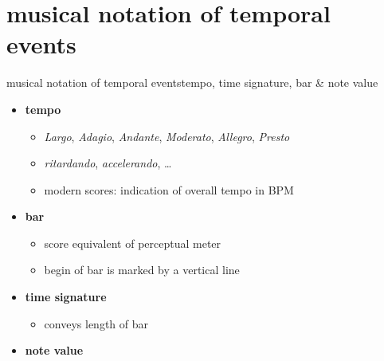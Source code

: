     \section[musical]{musical notation of temporal events}
        \begin{frame}{musical notation of temporal events}{tempo, time signature, bar \& note value}
            \begin{itemize}
                \item	\textbf{tempo}
                    \begin{itemize}
                        \item	\textsl{Largo}, \textsl{Adagio}, \textsl{Andante}, \textsl{Moderato}, \textsl{Allegro}, \textsl{Presto}
                        \pause
                        \item	\textsl{ritardando}, \textsl{accelerando}, \ldots
                        \pause
                        \item	modern scores: indication of overall tempo in \unit{BPM}
                    \end{itemize}
                \item<2->	\textbf{bar}
                    \begin{itemize}
                        \item	score equivalent of perceptual meter
                        \pause
                        \item	begin of bar is marked by a vertical line
                    \end{itemize}
                \item<3->	\textbf{time signature}
                    \begin{itemize}
                        \item	conveys length of bar
                    \end{itemize}
                \item<4->	\textbf{note value}
            \end{itemize}
        \end{frame}
        
